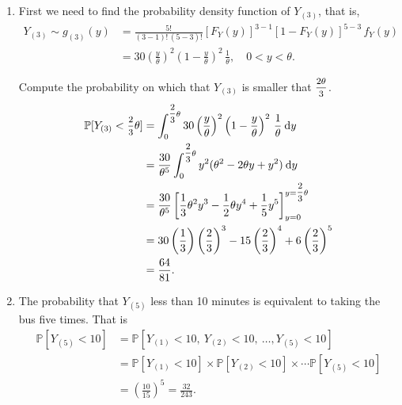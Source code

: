 \begin{solution}
\begin{enumerate}
    \item First we need to find the probability density function of $Y_{(3)}$, that is,
    \begin{align*}
        Y_{(3)} \sim g_{(3)}(y) &= \frac{5!}{(3-1)!\, (5-3)!} [F_Y(y)]^{3-1} [1 - F_Y(y)]^{5-3}\, f_Y(y)\\
        &= 30 \left( \frac{y}{\theta} \right)^2 \left(1 - \frac{y}{\theta} \right)^2\, \frac{1}{\theta}, \quad 0 < y < \theta.
    \end{align*}

    Compute the probability on which that $Y_{(3)}$ is smaller that $\mfrac{2\theta}{3}$.
    \begin{align*}
        \mathbb{P}[Y_{(3)} < \mfrac{2}{3}\theta] &= \int_{0}^{\mfrac{2}{3}\theta} 30 \left( \frac{y}{\theta} \right)^2 \left(1 - \frac{y}{\theta} \right)^2\, \frac{1}{\theta} \> \mathrm{d}y\\
        &= \frac{30}{\theta^5} \int_{0}^{\mfrac{2}{3}\theta} y^2 (\theta^2 - 2\theta y + y^2) \> \mathrm{d}y\\
        &= \frac{30}{\theta^5} \left[ \frac{1}{3}\theta^2 y^3 - \frac{1}{2}\theta y^4 + \frac{1}{5}y^5 \right]^{y=\mfrac{2}{3}\theta}_{y=0}\\
        &= 30 \left(\frac{1}{3}\right) \left(\frac{2}{3}\right)^3 - 15 \left(\frac{2}{3}\right)^4 + 6\left(\frac{2}{3}\right)^5\\
        &= \frac{64}{81}.
    \end{align*}

    \item The probability that $Y_{(5)}$ less than 10 minutes is equivalent to 
        taking the bus five times. That is 
        \begin{align*}
            \mathbb{P}[Y_{(5)} < 10] &= \mathbb{P}[Y_{(1)} < 10,\> Y_{(2)} < 10,\> \ldots, Y_{(5)} < 10]\\
            &= \mathbb{P}[Y_{(1)} < 10] \times \mathbb{P}[Y_{(2)} < 10] \times \cdots \mathbb{P}[Y_{(5)} < 10]\\
            &= \left( \frac{10}{15} \right)^5
            = \frac{32}{243}.
        \end{align*}
    \end{enumerate}
\end{solution}